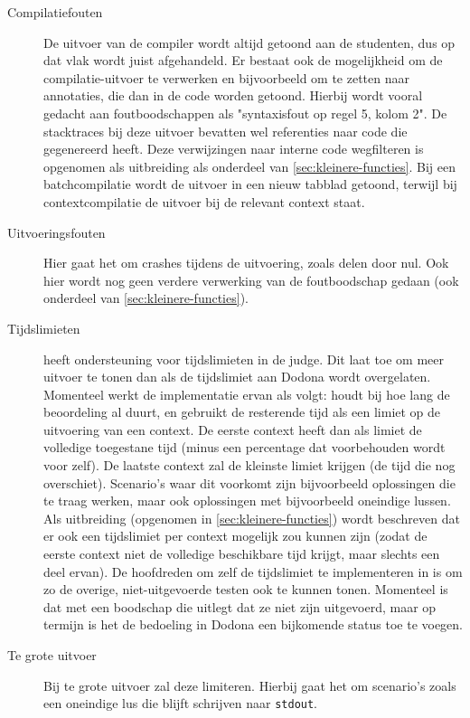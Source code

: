 \begin{description}
    \item[Compilatiefouten] De uitvoer van de compiler wordt altijd getoond aan de studenten, dus op dat vlak wordt juist afgehandeld.
    Er bestaat ook de mogelijkheid om de compilatie-uitvoer te verwerken en bijvoorbeeld om te zetten naar annotaties, die dan in de code worden getoond.
    Hierbij wordt vooral gedacht aan foutboodschappen als "syntaxisfout op regel 5, kolom 2".
    De stacktraces bij deze uitvoer bevatten wel referenties naar code die \tested{} gegenereerd heeft.
    Deze verwijzingen naar interne code wegfilteren is opgenomen als uitbreiding als onderdeel van \cref{sec:kleinere-functies}.
    Bij een batchcompilatie wordt de uitvoer in een nieuw tabblad getoond, terwijl bij contextcompilatie de uitvoer bij de relevant context staat.
    \item[Uitvoeringsfouten] Hier gaat het om crashes tijdens de uitvoering, zoals delen door nul.
    Ook hier wordt nog geen verdere verwerking van de foutboodschap gedaan (ook onderdeel van \cref{sec:kleinere-functies}).
    \item[Tijdslimieten] \tested{} heeft ondersteuning voor tijdslimieten in de judge.
    Dit laat toe om meer uitvoer te tonen dan als de tijdslimiet aan Dodona wordt overgelaten.
    Momenteel werkt de implementatie ervan als volgt: \tested{} houdt bij hoe lang de beoordeling al duurt, en gebruikt de resterende tijd als een limiet op de uitvoering van een context.
    De eerste context heeft dan als limiet de volledige toegestane tijd (minus een percentage dat voorbehouden wordt voor \tested{} zelf).
    De laatste context zal de kleinste limiet krijgen (de tijd die nog overschiet).
    Scenario's waar dit voorkomt zijn bijvoorbeeld oplossingen die te traag werken, maar ook oplossingen met bijvoorbeeld oneindige lussen.
    Als uitbreiding (opgenomen in \cref{sec:kleinere-functies}) wordt beschreven dat er ook een tijdslimiet per context mogelijk zou kunnen zijn (zodat de eerste context niet de volledige beschikbare tijd krijgt, maar slechts een deel ervan).
    De hoofdreden om zelf de tijdslimiet te implementeren in \tested{} is om zo de overige, niet-uitgevoerde testen ook te kunnen tonen.
    Momenteel is dat met een boodschap die uitlegt dat ze niet zijn uitgevoerd, maar op termijn is het de bedoeling in Dodona een bijkomende status toe te voegen.
    \item[Te grote uitvoer] Bij te grote uitvoer zal \tested{} deze limiteren.
    Hierbij gaat het om scenario's zoals een oneindige lus die blijft schrijven naar \texttt{stdout}.

\end{description}
